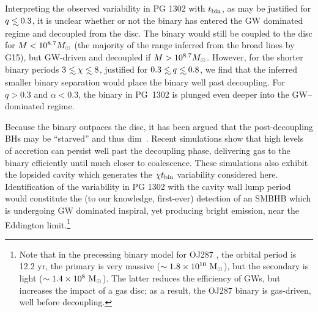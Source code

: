 Interpreting the observed variability in PG 1302 with $t_{\rm bin}$, as
may be justified for $q\lsim 0.3$, it is unclear whether or not the
binary has entered the GW dominated regime and decoupled from the
disc. The binary would still be coupled to the disc for 
$M<10^{8.7} {{M_{\odot}}}$ (the majority of the range inferred from the broad lines by G15), but GW-driven and decoupled if
$M>10^{8.7} {{M_{\odot}}}$. However, for the shorter binary periods $3 \lsim
\chi\lsim8$, justified for $0.3 \lsim q \lsim 0.8$, we find
that the inferred smaller binary separation would place the binary
well past decoupling.  For $q>0.3$ and $\alpha<0.3$, the binary in
PG~1302 is plunged even deeper into the GW--dominated regime.




Because the binary outpaces the disc, it has
been argued that the post-decoupling BHs may be ``starved'' and thus
dim~\citep{Milos:Phinney:2005,Shapiro:2010,TanakaMenou:2010}. Recent simulations
\citep{Noble+2012, Farris:2015:GW} show that high levels of accretion
can persist well past the decoupling phase, delivering gas to the
binary efficiently until much closer to coalescence. These simulations
also exhibit the lopsided cavity which generates the $\chi t_{\rm{bin}}$
variability considered here. Identification of the variability in PG
1302 with the cavity wall lump period would constitute the (to our
knowledge, first-ever) detection of an SMBHB which is undergoing GW
dominated inspiral, yet producing bright emission, near the Eddington
limit.\vspace{-1\baselineskip}\footnote{Note that in the precessing
  binary model for OJ287 \citep{LehtoValtonen1996,Valtonen+2008}, the
  orbital period is 12.2 yr, the primary is very massive ($\sim
  1.8\times10^{10}~{\rm M_\odot}$), but the secondary is light ($\sim
  1.4\times10^{8}~{\rm M_\odot}$). The latter reduces the efficiency
  of GWs, but increases the impact of a gas disc; as a result, the
  OJ287 binary is gas-driven, well before decoupling.}



 



